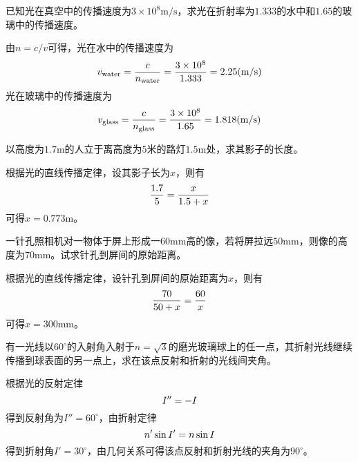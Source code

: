 \documentclass[cn,10pt,chinesefont=founder,math=mtpro2,cite=super,toc=onecol,twoside,openany]{elegantbook}
\begin{document}
\begin{problem}
	已知光在真空中的传播速度为$3\times10^8\mathrm{m/s}$，求光在折射率为$1.333$的水中和$1.65$的玻璃中的传播速度。
\end{problem}
\begin{solution}
	由$n=c/v$可得，光在水中的传播速度为
	\begin{equation}
	v_{\mathrm{water}}=\frac{c}{n_{\mathrm{water}}}=\frac{3\times10^8}{1.333}=2.25(\mathrm{m/s})\notag
	\end{equation}
	光在玻璃中的传播速度为
	\begin{equation}
	v_{\mathrm{glass}}=\frac{c}{n_{\mathrm{glass}}}=\frac{3\times10^8}{1.65}=1.818(\mathrm{m/s})\notag
	\end{equation}
\end{solution}

\begin{problem}
	以高度为$1.7\mathrm{m}$的人立于离高度为$5$米的路灯$1.5\mathrm{m}$处，求其影子的长度。
\end{problem}
\begin{solution}
	根据光的直线传播定律，设其影子长为$x$，则有
	\begin{equation}
	\frac{1.7}{5}=\frac{x}{1.5+x}\notag
	\end{equation}
	可得$x=0.773\mathrm{m}$。
\end{solution}

\begin{problem}
	一针孔照相机对一物体于屏上形成一$60\mathrm{mm}$高的像，若将屏拉远$50\mathrm{mm}$，则像的高度为$70\mathrm{mm}$。试求针孔到屏间的原始距离。
\end{problem}
\begin{solution}
	根据光的直线传播定律，设针孔到屏间的原始距离为$x$，则有
	\begin{equation}
	\frac{70}{50+x}=\frac{60}{x}\notag
	\end{equation}
	可得$x=300\mathrm{mm}$。
\end{solution}

\begin{problem}
	有一光线以$60^{\circ}$的入射角入射于$n=\sqrt{3}$的磨光玻璃球上的任一点，其折射光线继续传播到球表面的另一点上，求在该点反射和折射的光线间夹角。
\end{problem}
\begin{solution}
	根据光的反射定律
	\begin{equation}
	I''=-I\notag
	\end{equation}
	得到反射角为$I''=60^{\circ}$，由折射定律
	\begin{equation}
	n'\sin I'=n\sin I\notag
	\end{equation}
	得到折射角$I'=30^{\circ}$，由几何关系可得该点反射和折射光线的夹角为$90^{\circ}$。
\end{solution}
\end{document}
